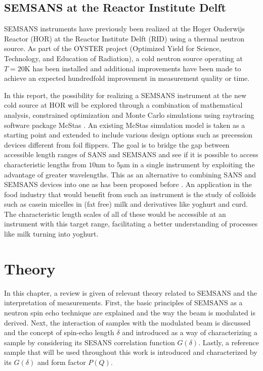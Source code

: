 \documentclass{article}
\begin{document}
\subsection{SEMSANS at the Reactor Institute Delft}
\label{c1.2}

SEMSANS instruments have previously been realized at the Hoger Onderwijs Reactor (HOR) at the Reactor Institute Delft (RID) using a thermal neutron source. As part of the OYSTER project (Optimized Yield for Science, Technology, and Education of Radiation), a cold neutron source operating at $T=20 \unit{\kelvin}$ has been installed and additional improvements have been made to achieve an expected hundredfold improvement in measurement quality or time.

In this report, the possibility for realizing a SEMSANS instrument at the new cold source at HOR will be explored through a combination of mathematical analysis, constrained optimization and Monte Carlo simulations using raytracing software package McStas \cite{willendrup2020}. An existing McStas simulation model \cite{bouwman2021b} is taken as a starting point and extended to include various design options such as precession devices different from foil flippers. 
The goal is to bridge the gap between accessible length ranges of SANS and SEMSANS \cite{bouwman2021} and see if it is possible to access characteristic lengths from $10 \unit{\nano\meter}$ to $5 \unit{\micro\meter}$ in a single instrument by exploiting the advantage of greater wavelengths. This as an alternative to combining SANS and SEMSANS devices into one as has been proposed before \cite{bouwman2011}\cite{kusmin2017}. An application in the food industry that would benefit from such an instrument is the study of colloids such as casein micelles in (fat free) milk and derivatives like yoghurt and curd. The characteristic length scales of all of these would be accessible at an instrument with this target range, facilitating a better understanding of processes like milk turning into yoghurt. 

\newpage 
\section{Theory}
\label{c2:theory}
In this chapter, a review is given of relevant theory related to SEMSANS and the interpretation of measurements. First, the basic principles of SEMSANS as a neutron spin echo technique are explained and the way the beam is modulated is derived. Next, the interaction of samples with the modulated beam is discussed and the concept of spin-echo length $\delta$ and introduced as a way of characterizing a sample by considering its SESANS correlation function $G(\delta)$. Lastly, a reference sample that will be used throughout this work is introduced and characterized by its $G(\delta)$ and form factor $P(Q)$. 
\end{document}
